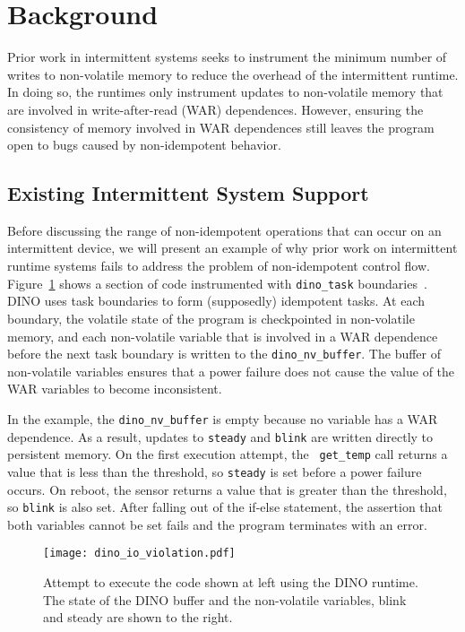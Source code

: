 \section{Background}
Prior work in intermittent systems seeks to instrument the minimum number of
writes to non-volatile memory to reduce the overhead of the intermittent
runtime. In doing so, the runtimes only instrument updates to non-volatile
memory that are involved in write-after-read (WAR) dependences. However,
ensuring the consistency of memory involved in WAR dependences still leaves the
program open to bugs caused by non-idempotent behavior.

\subsection{Existing Intermittent System Support}
Before discussing the range of non-idempotent operations that can occur on an
intermittent device, we will present an example of why prior work on
intermittent runtime systems fails to address the problem of non-idempotent
control flow. Figure~\ref{fig:dino} shows a section of code instrumented with
{\tt dino\_task} boundaries~\cite{dino}. DINO uses task boundaries to form
(supposedly) idempotent tasks. At each boundary, the volatile state of the program is
checkpointed in non-volatile memory, and each non-volatile variable that is
involved in a WAR dependence before the next task boundary is written to the
{\tt dino\_nv\_buffer}. The buffer of non-volatile variables ensures that a
power failure does not cause the value of the WAR variables to become
inconsistent.

In the example, the {\tt dino\_nv\_buffer} is empty because no variable has a
WAR dependence.  As a result, updates to {\tt steady} and {\tt blink} are
written directly to persistent memory. On the first execution attempt, the {\tt
get\_temp} call returns a value that is less than the threshold, so {\tt steady}
is set before a power failure occurs. On reboot, the sensor returns a value that
is greater than the threshold, so {\tt blink} is also set. After falling out of
the if-else statement, the assertion that both variables cannot be set fails and
the program terminates with an error.


\begin{figure}[htb]
\centering
\texttt{[image: dino\_io\_violation.pdf]}
\caption{Attempt to execute the code shown at left using the DINO runtime. The
state of the DINO buffer and the non-volatile variables, blink and steady are
shown to the right.}
\label{fig:dino}
\end{figure}

